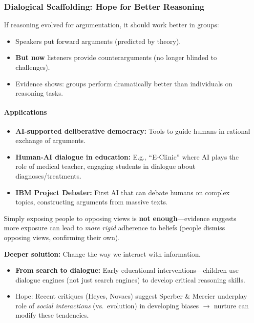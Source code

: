 \separator

\subsubsection{Dialogical Scaffolding: Hope for Better Reasoning}

\begin{keybox}
If reasoning evolved for argumentation, it should work better in groups:
\begin{itemize}
  \item Speakers put forward arguments (predicted by theory).
  \item \textbf{But now} listeners provide counterarguments (no longer blinded to challenges).
  \item Evidence shows: groups perform dramatically better than individuals on reasoning tasks.
\end{itemize}
\end{keybox}

\paragraph*{Applications}

\begin{itemize}
  \item \textbf{AI-supported deliberative democracy:} Tools to guide humans in rational exchange of arguments.
  \item \textbf{Human-AI dialogue in education:} E.g., ``E-Clinic'' where AI plays the role of medical teacher, engaging students in dialogue about diagnoses/treatments.
  \item \textbf{IBM Project Debater:} First AI that can debate humans on complex topics, constructing arguments from massive texts.
\end{itemize}

\begin{tipbox}
Simply exposing people to opposing views is \textbf{not enough}---evidence suggests more exposure can lead to \textit{more rigid} adherence to beliefs (people dismiss opposing views, confirming their own).

\textbf{Deeper solution:} Change the way we interact with information.
\begin{itemize}
  \item \textbf{From search to dialogue:} Early educational interventions---children use dialogue engines (not just search engines) to develop critical reasoning skills.
  \item Hope: Recent critiques (Heyes, Novaes) suggest Sperber \& Mercier underplay role of \textit{social interactions} (vs.\ evolution) in developing biases $\to$ nurture can modify these tendencies.
\end{itemize}
\end{tipbox}

